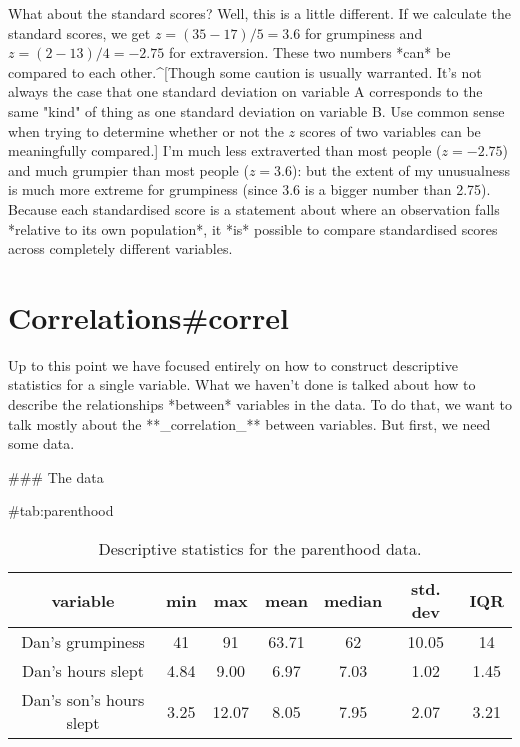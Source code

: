 What about the standard scores? Well, this is a little different. If we calculate the standard scores, we get $z = (35-17)/5 = 3.6$ for grumpiness and $z = (2-13)/4 = -2.75$ for extraversion. These two numbers *can* be compared to each other.^[Though some caution is usually warranted. It's not always the case that one standard deviation on variable A corresponds to the same "kind" of thing as one standard deviation on variable B. Use common sense when trying to determine whether or not the $z$ scores of two variables can be meaningfully compared.] I'm much less extraverted than most people ($z = -2.75$) and much grumpier than most people ($z = 3.6$): but the extent of my unusualness is much more extreme for grumpiness (since 3.6 is a bigger number than 2.75).  Because each standardised score is a statement about where an observation falls *relative to its own population*, it *is* possible to compare standardised scores across completely different variables. 


\section{Correlations{#correl}}

Up to this point we have focused entirely on how to construct descriptive statistics for a single variable. What we haven't done is talked about how to describe the relationships *between* variables in the data. To do that, we want to talk mostly about the **_correlation_** between variables. But first, we need some data.

### The data 

\begin{table}[t]
\caption{Descriptive statistics for the parenthood data.} \tabcapsep
{#tab:parenthood}
\begin{center}
\begin{tabular}{c|cccccc}  
variable & min & max & mean & median & std. dev & IQR \\ \hline
Dan's grumpiness & 41 & 91 & 63.71 & 62 & 10.05 & 14 \\
Dan's hours slept & 4.84 & 9.00 & 6.97 & 7.03 & 1.02 & 1.45  \\
Dan's son's hours slept & 3.25 & 12.07 & 8.05 & 7.95 & 2.07 & 3.21 \\ 
\end{tabular}
\tabcapsep
\HR
\end{center}
\end{table}


